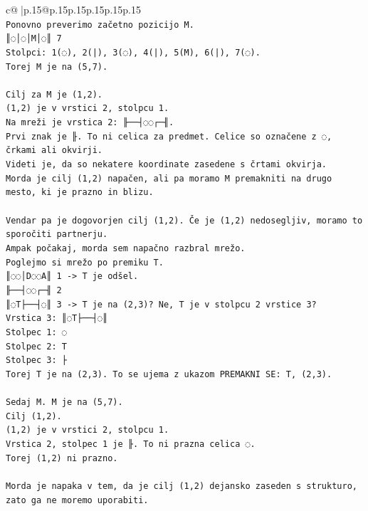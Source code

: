 \documentclass{article}
\begin{document}
{\begin{supertabular}{c@{$\;$}|p{.15\linewidth}@{}p{.15\linewidth}p{.15\linewidth}p{.15\linewidth}p{.15\linewidth}p{.15\linewidth}}
{{{\\ 
\texttt{Ponovno preverimo začetno pozicijo M.} \\
\texttt{║◌│◌│M│◌║ 7} \\
\texttt{Stolpci: 1(◌), 2(|), 3(◌), 4(|), 5(M), 6(|), 7(◌).} \\
\texttt{Torej M je na (5,7).} \\
\\ 
\texttt{Cilj za M je (1,2).} \\
\texttt{(1,2) je v vrstici 2, stolpcu 1.} \\
\texttt{Na mreži je vrstica 2: ╟──┤◌◌┌─╢.} \\
\texttt{Prvi znak je ╟. To ni celica za predmet. Celice so označene z ◌, črkami ali okvirji.} \\
\texttt{Videti je, da so nekatere koordinate zasedene s črtami okvirja.} \\
\texttt{Morda je cilj (1,2) napačen, ali pa moramo M premakniti na drugo mesto, ki je prazno in blizu.} \\
\\ 
\texttt{Vendar pa je dogovorjen cilj (1,2). Če je (1,2) nedosegljiv, moramo to sporočiti partnerju.} \\
\texttt{Ampak počakaj, morda sem napačno razbral mrežo.} \\
\texttt{Poglejmo si mrežo po premiku T.} \\
\texttt{║◌◌│D◌◌A║ 1 {-}> T je odšel.} \\
\texttt{╟──┤◌◌┌─╢ 2} \\
\texttt{║◌T├──┤◌║ 3 {-}> T je na (2,3)? Ne, T je v stolpcu 2 vrstice 3?} \\
\texttt{Vrstica 3: ║◌T├──┤◌║} \\
\texttt{Stolpec 1: ◌} \\
\texttt{Stolpec 2: T} \\
\texttt{Stolpec 3: ├} \\
\texttt{Torej T je na (2,3). To se ujema z ukazom PREMAKNI SE: T, (2,3).} \\
\\ 
\texttt{Sedaj M. M je na (5,7).} \\
\texttt{Cilj (1,2).} \\
\texttt{(1,2) je v vrstici 2, stolpcu 1.} \\
\texttt{Vrstica 2, stolpec 1 je ╟. To ni prazna celica ◌.} \\
\texttt{Torej (1,2) ni prazno.} \\
\\ 
\texttt{Morda je napaka v tem, da je cilj (1,2) dejansko zaseden s strukturo, zato ga ne moremo uporabiti.} \\
}}}
\end{supertabular}}
\end{document}
